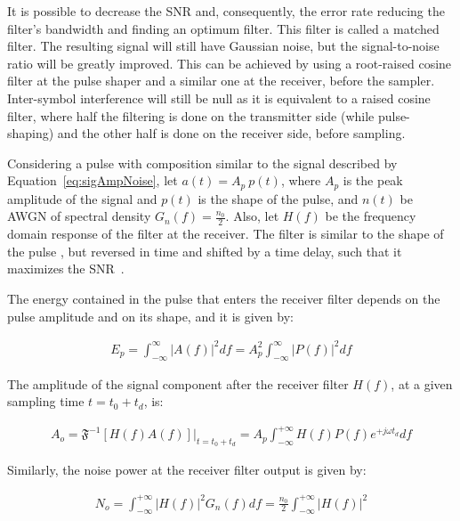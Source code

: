 \begin{refsection}
It is possible to decrease the SNR and, consequently, the error rate reducing
the filter's bandwidth and finding an optimum filter. This filter is called a
matched filter. The resulting signal will still have Gaussian noise, but the
signal-to-noise ratio will be greatly improved. This can be achieved by using a
root-raised cosine filter at the pulse shaper and a similar one at the receiver,
before the sampler. Inter-symbol interference will still be null as it is
equivalent to a raised cosine filter, where half the filtering is done on the
transmitter side (while pulse-shaping) and the other half is done on the
receiver side, before sampling.

Considering a pulse with composition similar to the signal described by
Equation~\ref{eq:sigAmpNoise}, let $ a(t) = A_p~p(t) $, where $A_p$ is the peak
amplitude of the signal and $p(t)$ is the shape of the pulse, and $n(t)$ be AWGN
of spectral density $G_n(f) = \frac{n_0}{2}$. Also, let $H(f)$ be the frequency
domain response of the filter at the receiver.
The filter is similar to the shape of the pulse , but reversed in time and shifted by a time delay, such that it maximizes the SNR~\cite{carlson86}.

The energy contained in the pulse that enters the receiver filter depends on the
pulse amplitude and on its shape, and it is given by:

\begin{eqnarray}\label{eq:pulseEnergy}
E_p = \int_{-\infty}^{\infty} {|A(f)|}^2 df = A_p^2 \int_{-\infty}^{\infty} {|P(f)|}^2 df
\end{eqnarray}

The amplitude of the signal component after the receiver filter $H(f)$, at a given sampling time $t=t_0+t_d$, is:

\begin{eqnarray}
A_o = \mathfrak{F}^{-1}\left[H(f) A(f)\right]\big|_{t=t_0+t_d} = A_p \int_{-\infty}^{+\infty} H(f) P(f) e^{+j \omega t_d}df
\end{eqnarray}

Similarly, the noise power at the receiver filter output is given by:

\begin{eqnarray}
N_o = \int_{-\infty}^{+\infty} {|H(f)|}^2 G_n(f) df = \frac{n_0}{2} \int_{-\infty}^{+\infty} {|H(f)|}^2
\end{eqnarray}


\end{refsection}
